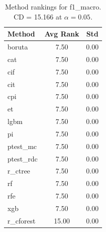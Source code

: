 \begin{table}[h]
\centering
\caption{Method rankings for f1_macro. CD = 15.166 at $\alpha=0.05$.}
\label{tab:ranks_f1_macro}
\begin{tabular}{lcc}
\toprule
Method & Avg Rank & Std \\
\midrule
boruta & 7.50 & 0.00 \\
cat & 7.50 & 0.00 \\
cif & 7.50 & 0.00 \\
cit & 7.50 & 0.00 \\
cpi & 7.50 & 0.00 \\
et & 7.50 & 0.00 \\
lgbm & 7.50 & 0.00 \\
pi & 7.50 & 0.00 \\
ptest_mc & 7.50 & 0.00 \\
ptest_rdc & 7.50 & 0.00 \\
r_ctree & 7.50 & 0.00 \\
rf & 7.50 & 0.00 \\
rfe & 7.50 & 0.00 \\
xgb & 7.50 & 0.00 \\
r_cforest & 15.00 & 0.00 \\
\bottomrule
\end{tabular}
\end{table}
